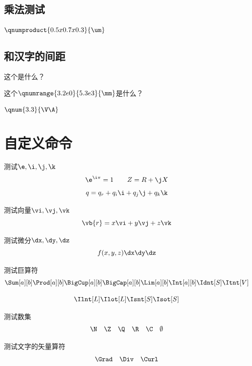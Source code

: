 \subsection{乘法测试}
$\qnumproduct{0.5x0.7x0.3}{\um}$

\subsection{和汉字的间距}

这个是什么？

这个$\qnumrange{3.2e0}{5.3e3}{\mm}$是什么？


$\qnum{3.3}{\V\A}$

\section{自定义命令}

测试$\e,\i,\j,\k$
\begin{equation}
    \e^{\i\pi}=1\qquad
    Z=R+\j X
\end{equation}
\begin{equation}
    q=q_r+q_i\i+q_j\j+q_k\k
\end{equation}

测试向量$\vi,\vj,\vk$
\begin{equation}
    \vb{r}=x\vi+y\vj+z\vk
\end{equation}

测试微分$\dx,\dy,\dz$
\begin{equation}
    f(x,y,z)\dx\dy\dz
\end{equation}

测试巨算符
\begin{equation}
    \Sum[a][b] \Prod[a][b] \BigCup[a][b] \BigCap[a][b] \Lim[a][b]
    \Int[a][b] \Idnt[S] \Itnt[V]
\end{equation}

\begin{equation}
    \Ilnt[L] \Ilot[L] \Isnt[S] \Isot[S] 
\end{equation}

测试数集
\begin{equation}
    \N\quad
    \Z\quad
    \Q\quad
    \R\quad
    \C\quad
    \emptyset
\end{equation}

测试文字的矢量算符
\begin{equation}
    \Grad\quad
    \Div\quad
    \Curl
\end{equation}

